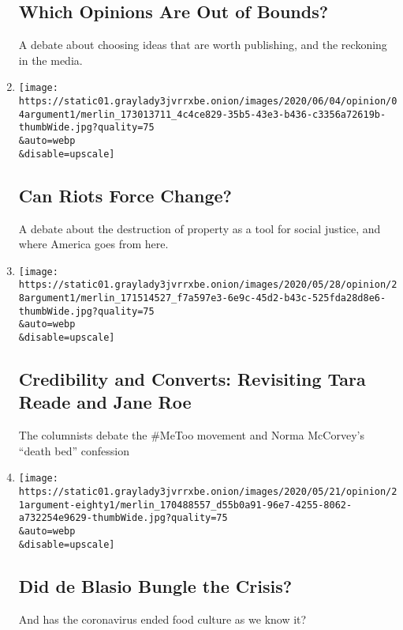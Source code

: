 \begin{enumerate}
{  \subsection{Which Opinions Are Out of
  Bounds?}\label{which-opinions-are-out-of-bounds}}

  A debate about choosing ideas that are worth publishing, and the
  reckoning in the media.
\item
  \href{/2020/06/04/opinion/the-argument-protest-riot-violence.html}{}

  \texttt{[image: https://static01.graylady3jvrrxbe.onion/images/2020/06/04/opinion/04argument1/merlin\_173013711\_4c4ce829-35b5-43e3-b436-c3356a72619b-thumbWide.jpg?quality=75\\\&auto=webp\\\&disable=upscale]}

  \hypertarget{can-riots-force-change}{%
  \subsection{Can Riots Force Change?}\label{can-riots-force-change}}

  A debate about the destruction of property as a tool for social
  justice, and where America goes from here.
\item
  \href{/2020/05/28/opinion/the-argument-tara-reade-norma-mccorvey.html}{}

  \texttt{[image: https://static01.graylady3jvrrxbe.onion/images/2020/05/28/opinion/28argument1/merlin\_171514527\_f7a597e3-6e9c-45d2-b43c-525fda28d8e6-thumbWide.jpg?quality=75\\\&auto=webp\\\&disable=upscale]}

  \hypertarget{credibility-and-converts-revisiting-tara-reade-and-jane-roe}{%
  \subsection{Credibility and Converts: Revisiting Tara Reade and Jane
  Roe}\label{credibility-and-converts-revisiting-tara-reade-and-jane-roe}}

  The columnists debate the \#MeToo movement and Norma McCorvey's
  ``death bed'' confession
\item
  \href{/2020/05/21/opinion/the-argument-de-blasio-cuomo-coronavirus.html}{}

  \texttt{[image: https://static01.graylady3jvrrxbe.onion/images/2020/05/21/opinion/21argument-eighty1/merlin\_170488557\_d55b0a91-96e7-4255-8062-a732254e9629-thumbWide.jpg?quality=75\\\&auto=webp\\\&disable=upscale]}

  \hypertarget{did-de-blasio-bungle-the-crisis}{%
  \subsection{Did de Blasio Bungle the
  Crisis?}\label{did-de-blasio-bungle-the-crisis}}

  And has the coronavirus ended food culture as we know it?
\end{enumerate}

